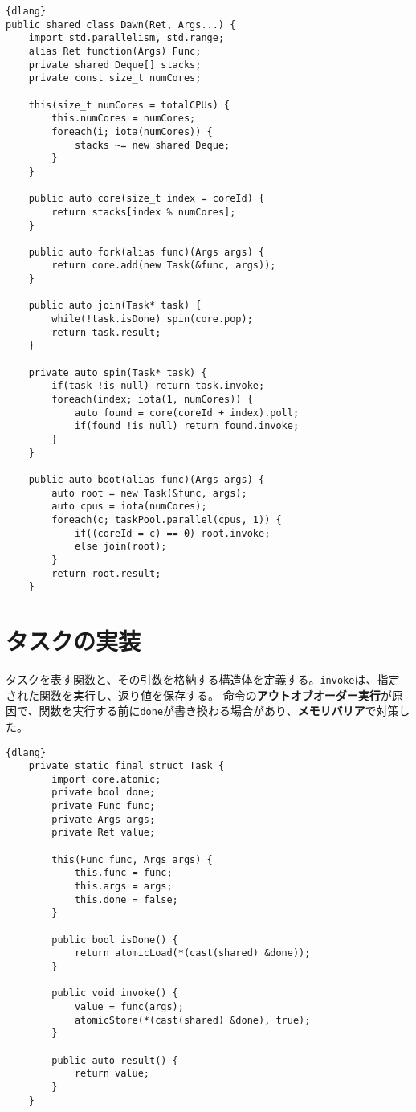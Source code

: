 \documentclass[10pt,a4paper]{book}
\begin{document}
\begin{Verbatim}{dlang}
public shared class Dawn(Ret, Args...) {
	import std.parallelism, std.range;
	alias Ret function(Args) Func;
	private shared Deque[] stacks;
	private const size_t numCores;

	this(size_t numCores = totalCPUs) {
		this.numCores = numCores;
		foreach(i; iota(numCores)) {
			stacks ~= new shared Deque;
		}
	}

	public auto core(size_t index = coreId) {
		return stacks[index % numCores];
	}

	public auto fork(alias func)(Args args) {
		return core.add(new Task(&func, args));
	}

	public auto join(Task* task) {
		while(!task.isDone) spin(core.pop);
		return task.result;
	}

	private auto spin(Task* task) {
		if(task !is null) return task.invoke;
		foreach(index; iota(1, numCores)) {
			auto found = core(coreId + index).poll;
			if(found !is null) return found.invoke;
		}
	}

	public auto boot(alias func)(Args args) {
		auto root = new Task(&func, args);
		auto cpus = iota(numCores);
		foreach(c; taskPool.parallel(cpus, 1)) {
			if((coreId = c) == 0) root.invoke;
			else join(root);
		}
		return root.result;
	}
\end{Verbatim}

\section{タスクの実装}

タスクを表す関数と、その引数を格納する構造体を定義する。\texttt{invoke}は、指定された関数を実行し、返り値を保存する。
命令の\textbf{アウトオブオーダー実行}が原因で、関数を実行する前に\texttt{done}が書き換わる場合があり、\textbf{メモリバリア}で対策した。

\begin{Verbatim}{dlang}
	private static final struct Task {
		import core.atomic;
		private bool done;
		private Func func;
		private Args args;
		private Ret value;

		this(Func func, Args args) {
			this.func = func;
			this.args = args;
			this.done = false;
		}

		public bool isDone() {
			return atomicLoad(*(cast(shared) &done));
		}

		public void invoke() {
			value = func(args);
			atomicStore(*(cast(shared) &done), true);
		}

		public auto result() {
			return value;
		}
	}
\end{Verbatim}
\end{document}
